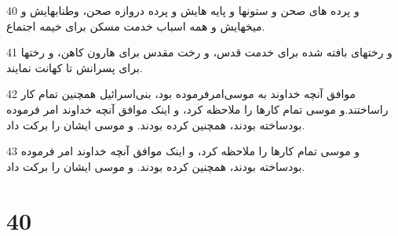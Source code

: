\par 40 و پرده های صحن و ستونها و پایه هایش و پرده دروازه صحن، وطنابهایش و میخهایش و همه اسباب خدمت مسکن برای خیمه اجتماع.
\par 41 و رختهای بافته شده برای خدمت قدس، و رخت مقدس برای هارون کاهن، و رختها برای پسرانش تا کهانت نمایند.
\par 42 موافق آنچه خداوند به موسی‌امرفرموده بود، بنی‌اسرائیل همچنین تمام کار راساختند.و موسی تمام کارها را ملاحظه کرد، و اینک موافق آنچه خداوند امر فرموده بودساخته بودند، همچنین کرده بودند. و موسی ایشان را برکت داد.
\par 43 و موسی تمام کارها را ملاحظه کرد، و اینک موافق آنچه خداوند امر فرموده بودساخته بودند، همچنین کرده بودند. و موسی ایشان را برکت داد.
 
\chapter{40}

